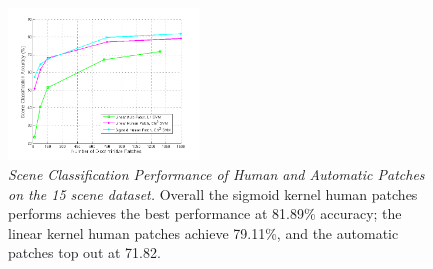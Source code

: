 \documentclass[10pt,twocolumn,letterpaper]{article}
\begin{document}
\begin{figure}
\centering
 \includegraphics[width=0.45\textwidth, height=0.15\textheight]{perf.png}
 \caption{\small\textit{Scene Classification Performance of Human and Automatic Patches on the 15 scene dataset.}  Overall the sigmoid kernel human patches performs achieves the best performance at 81.89\% accuracy; the linear kernel human patches achieve 79.11\%, and the automatic patches top out at 71.82.}
\vspace{-4mm}

\label{fig:results}
\end{figure}
\end{document}
